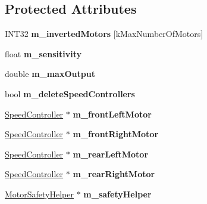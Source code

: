 \subsection*{Protected Attributes}
\begin{DoxyCompactItemize}
\item 
\hypertarget{classRobotDrive_abcfae675b4a3eaf7367618f8dfb41a50}{
INT32 {\bfseries m\_\-invertedMotors} \mbox{[}kMaxNumberOfMotors\mbox{]}}
\label{classRobotDrive_abcfae675b4a3eaf7367618f8dfb41a50}

\item 
\hypertarget{classRobotDrive_a08cc0269fd9b61a9d8f533c1f177057f}{
float {\bfseries m\_\-sensitivity}}
\label{classRobotDrive_a08cc0269fd9b61a9d8f533c1f177057f}

\item 
\hypertarget{classRobotDrive_a7b0af5263a4f1bd6b8fb71a707ed291f}{
double {\bfseries m\_\-maxOutput}}
\label{classRobotDrive_a7b0af5263a4f1bd6b8fb71a707ed291f}

\item 
\hypertarget{classRobotDrive_ae25a1fa747dcdd56da954f16898b258e}{
bool {\bfseries m\_\-deleteSpeedControllers}}
\label{classRobotDrive_ae25a1fa747dcdd56da954f16898b258e}

\item 
\hypertarget{classRobotDrive_a28786db2af3d04eb24e588c9e4e80d3a}{
\hyperlink{classSpeedController}{SpeedController} $\ast$ {\bfseries m\_\-frontLeftMotor}}
\label{classRobotDrive_a28786db2af3d04eb24e588c9e4e80d3a}

\item 
\hypertarget{classRobotDrive_a2a9790639e06361f4031871a32509deb}{
\hyperlink{classSpeedController}{SpeedController} $\ast$ {\bfseries m\_\-frontRightMotor}}
\label{classRobotDrive_a2a9790639e06361f4031871a32509deb}

\item 
\hypertarget{classRobotDrive_ab8ce1d64314ba60a7d32675464b57bb9}{
\hyperlink{classSpeedController}{SpeedController} $\ast$ {\bfseries m\_\-rearLeftMotor}}
\label{classRobotDrive_ab8ce1d64314ba60a7d32675464b57bb9}

\item 
\hypertarget{classRobotDrive_a3ba480ac56e25001b3d1b30caeefef2f}{
\hyperlink{classSpeedController}{SpeedController} $\ast$ {\bfseries m\_\-rearRightMotor}}
\label{classRobotDrive_a3ba480ac56e25001b3d1b30caeefef2f}

\item 
\hypertarget{classRobotDrive_ae10ae2087a59659a2a902e13da2b52d7}{
\hyperlink{classMotorSafetyHelper}{MotorSafetyHelper} $\ast$ {\bfseries m\_\-safetyHelper}}
\label{classRobotDrive_ae10ae2087a59659a2a902e13da2b52d7}

\end{DoxyCompactItemize}
